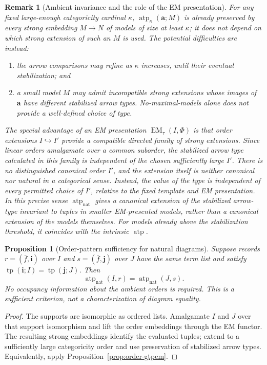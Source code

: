 \documentclass[11pt]{article}
\newcommand{\atp}{\operatorname{atp}}
\newcommand{\natatp}{\operatorname{atp}_{\mathrm{nat}}}
\newcommand{\EM}{\operatorname{EM}_{\tau}}
\newcommand{\ba}{\mathbf{a}}
\newcommand{\bi}{\mathbf{i}}
\newcommand{\bj}{\mathbf{j}}
\theoremstyle{plain}
\newtheorem{proposition}[definition]{Proposition}
\newtheorem{remark}[definition]{Remark}
\begin{document}
\begin{remark}[Ambient invariance and the role of the EM presentation]
\label{rem:nat-ambient}
For any fixed large-enough categoricity cardinal $\kappa$,
$\atp_\kappa(\ba;M)$ is already preserved by every
strong embedding $M\to N$ of models of size at
least $\kappa$; it does \emph{not} depend on which
strong extension of such an $M$ is used.
The potential difficulties are instead:
\begin{enumerate}[label=\textup{(\roman*)}]
\item the arrow comparisons may refine as $\kappa$ increases,
until their eventual stabilization; and
\item a small model $M$ may admit \emph{incompatible}
strong extensions whose images of $\ba$ have different
stabilized arrow types. No-maximal-models alone does
not provide a well-defined choice of type.
\end{enumerate}
The special advantage of an EM presentation
$\EM(I,\Phi)$ is that \emph{order extensions}
$I\hookrightarrow I'$ provide a compatible directed
family of strong extensions. Since linear orders
amalgamate over a common suborder, the stabilized
arrow type calculated in this family is independent
of the chosen sufficiently large $I'$.
There is no distinguished canonical order $I'$,
and the extension itself is neither canonical nor
natural in a categorical sense. Instead, the
\emph{value of the type} is independent of every
permitted choice of $I'$, relative to the fixed
template and EM presentation. In this precise
sense $\natatp$ gives a canonical extension of
the \emph{stabilized arrow-type invariant} to
tuples in smaller EM-presented models, rather
than a canonical extension of the models themselves.
For models already above the stabilization
threshold, it coincides with the intrinsic $\atp$.
\end{remark}

\begin{proposition}[Order-pattern sufficiency for natural diagrams]
\label{prop:order-pattern-nat}
Suppose records $r=(\bar f,\bi)$ over $I$ and
$s=(\bar f,\bj)$ over $J$ have the same term list
and satisfy
$\operatorname{tp}(\bi;I)=\operatorname{tp}(\bj;J)$.
Then
\[
\natatp(I,r)=\natatp(J,s).
\]
No occupancy information about the ambient orders
is required. This is a \emph{sufficient} criterion,
not a characterization of diagram equality.
\end{proposition}
\begin{proof}
The supports are isomorphic as ordered lists.
Amalgamate $I$ and $J$ over that support isomorphism
and lift the order embeddings through the EM functor.
The resulting strong embeddings identify
the evaluated tuples; extend to a sufficiently
large categoricity order and use preservation
of stabilized arrow types. Equivalently,
apply Proposition~\ref{prop:order-gtpem}.
\end{proof}
\end{document}

